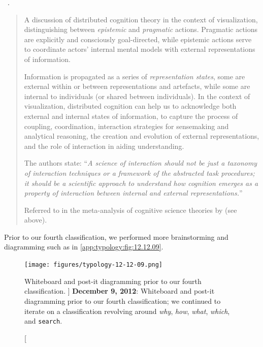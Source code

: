 \begin{sloppypar}
~\cite{Liu2008}. \end{sloppypar}

\begin{quotation}
    A discussion of distributed cognition theory in the context of visualization, distinguishing between {\it epistemic} and {\it pragmatic} actions.
    Pragmatic actions are explicitly and consciously goal-directed, while epistemic actions serve to coordinate actors' internal mental models with external representations of information.
    
    Information is propagated as a series of {\it representation states}, some are external within or between representations and artefacts, while some are internal to individuals (or shared between individuals).
    In the context of visualization, distributed cognition can help us to acknowledge both external and internal states of information, to capture the process of coupling, coordination, interaction strategies for sensemaking and analytical reasoning, the creation and evolution of external representations, and the role of interaction in aiding understanding. 
    
    The authors state: ``{\it A science of interaction should not be just a taxonomy of interaction techniques or a framework of the abstracted task procedures; it should be a scientific approach to understand how cognition emerges as a property of interaction between internal and external representations.}''
    
    Referred to in the meta-analysis of cognitive science theories by \citet{Pohl2012} (see above).
\end{quotation}

Prior to our fourth classification, we performed more brainstorming and diagramming such as in \autoref{app:typology:fig:12.12.09}.


\begin{figure}
	\centering
	\texttt{[image: figures/typology-12-12-09.png]}
	\caption
	[
	    Whiteboard and post-it diagramming prior to our fourth classification.
	]
	{
	    {\bf December 9, 2012}: Whiteboard and post-it diagramming prior to our fourth classification; we continued to iterate on a classification revolving around \textsl{why}, \textsl{how}, \textsl{what}, \textsl{which}, and {\tt search}.
	}
	\centering
	\label{app:typology:fig:12.12.09}
\end{figure}

